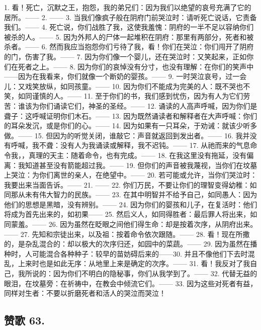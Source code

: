 1. 看！死亡，沉默之王，抱怨，我的弟兄们：因为我们以绝望的哀号充满了它的居所。—— 2. —— 3. 当我们像疯子般在阴府门前哭泣时：请听死亡说话，它责备我们。—— 4. 死亡说，你们战胜了我，这使我羞愧：阴府的一半不足以容纳你们被杀的人。—— 5. 因为外邦人的尸体一起堆积在阴府：那里有两部分，死者和被杀者。—— 6. 然而我应当抱怨你们亏待了我，看！你们在哭泣：你们闯开了阴府的门，伤害了我。—— 7. 因为你们像一个婴儿，还在哭泣时：又笑起来，正如你们在死者之上。—— 8. 因为你们的哀悼没有分寸，也没有理解：在你们的笑声中——因为在我看来，你们就像一个断奶的婴孩。—— 9. 一时哭泣哀号，过一会儿：又戏笑放纵，如同孩童。—— 10. 因为你们不能成为完美的人：既不哭也不笑，如同谨慎的人。—— 11. 至于你们的书，我们感到忧伤，因为有人为它们劳苦：谁该为你们诵读它们，神圣的圣经。—— 12. 诵读的人高声呼喊，因为你们是聋子：这呼喊证明你们木石。—— 13. 因为既然诵读者和解释者在大声呼喊：你们的耳朵发沉，或是你们的心。—— 14. 因为如果有一只耳朵，于劝诫：就该少听多做。—— 15. 但因为的听觉关闭，谁敲它：声音就返回到发出者。—— 16. 我并没有呼喊，我不聋：没有人为我诵读或解释，我不迟钝。—— 17. 从祂而来的气息命令我，，真理的天主：随着命令，也有完成。—— 18. 在我这里没有拖延，没有偏离：我知道甚至没有箭能超过我。—— 19. 但你们的声音被我蔑视，当你们在坟墓上哭泣：为你们离世的亲人，在绝望中。—— 20. 若可能或允许，当你们哭泣时：我要出来当面告诉。—— 21. —— 22. 你们万民，不要让你们的理智变得幼稚：如同那从未有伟大智力的民族。—— 23. 在其中明智并不给予自己，如同愚人：因为他们的思想是黑暗，没有辨别。—— 24. 因为你们的婴孩和儿子，在复活时：他们将成为首先出来的，如初果—— 25. 然后义人，如同得胜者：最后罪人将出来，如同蒙羞。—— 26. 因为虽然在眨眼之间他们得生命：却是按着次序，从阴府出来。—— 27. 先知和宗徒出来，以及祖：按着命令依次跟随。—— 28. 看！现在所撒的，是杂乱混合的：却以极大的次序归还，如园中的菜蔬。—— 29. 因为虽然在播种时，人可能混合各种种子：较早的苗妨碍后来的——30. 并且不像他们下去时混乱，上来时也是如此无序：从地里上来是确定的次序。—— 31. 看！我反对了我自己，我所说的：因为你们不明白的隐秘事，你们从我学到了。—— 32. 代替无益的眼泪，在坟墓旁：在祈祷中，在教会中倾流它们。—— 33. 因为这些对死者有益，同样对生者：不要以折磨死者和活人的哭泣而哭泣！\par


\subsection{赞歌 63.}


